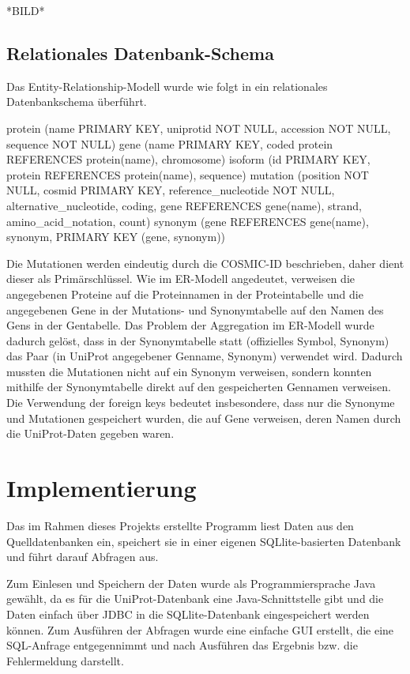 \documentclass{scrartcl}
\begin{document}
\newpage
*BILD*
\newpage

\subsection{Relationales Datenbank-Schema}

Das Entity-Relationship-Modell wurde wie folgt in ein relationales Datenbankschema überführt.

protein (name PRIMARY KEY, uniprotid NOT NULL, accession NOT NULL, sequence NOT NULL)
gene (name PRIMARY KEY, coded protein REFERENCES protein(name), chromosome)
isoform (id PRIMARY KEY, protein REFERENCES protein(name), sequence)
mutation (position NOT NULL, cosmid PRIMARY KEY, reference_nucleotide NOT NULL, alternative_nucleotide, coding, gene REFERENCES gene(name), strand, amino_acid_notation, count)
synonym (gene REFERENCES gene(name), synonym, PRIMARY KEY (gene, synonym))

Die Mutationen werden eindeutig durch die COSMIC-ID beschrieben, daher dient dieser als Primärschlüssel. Wie im ER-Modell angedeutet, verweisen die angegebenen Proteine auf die Proteinnamen in der Proteintabelle und die angegebenen Gene in der Mutations- und Synonymtabelle auf den Namen des Gens in der Gentabelle. 
   Das Problem der Aggregation im ER-Modell wurde dadurch gelöst, dass in der Synonymtabelle statt (offizielles Symbol, Synonym) das Paar (in UniProt angegebener Genname, Synonym) verwendet wird. Dadurch mussten die Mutationen nicht auf ein Synonym verweisen, sondern konnten mithilfe der Synonymtabelle direkt auf den gespeicherten Gennamen verweisen.
   Die Verwendung der foreign keys bedeutet insbesondere, dass nur die Synonyme und Mutationen gespeichert wurden, die auf Gene verweisen, deren Namen durch die UniProt-Daten gegeben waren.

\section{Implementierung}

Das im Rahmen dieses Projekts erstellte Programm liest Daten aus den Quelldatenbanken ein, speichert sie in einer eigenen SQLlite-basierten Datenbank und führt darauf Abfragen aus.

Zum Einlesen und Speichern der Daten wurde als Programmiersprache Java gewählt, da es für die UniProt-Datenbank eine Java-Schnittstelle gibt und die Daten einfach über JDBC in die SQLlite-Datenbank eingespeichert werden können. Zum Ausführen der Abfragen wurde eine einfache GUI erstellt, die eine SQL-Anfrage entgegennimmt und nach Ausführen das Ergebnis bzw. die Fehlermeldung darstellt.
\end{document}
